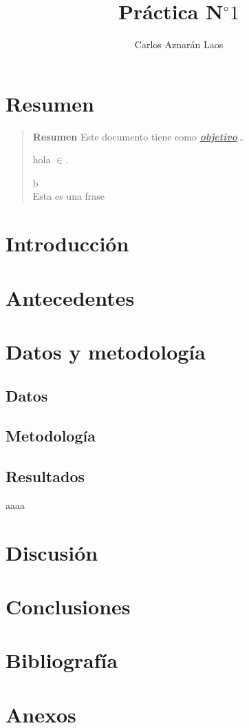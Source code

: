 \documentclass[12pt,a4paper,openany]{book}
\author{Carlos Aznarán Laos}
\title{Práctica N$^{\circ}1$}
\begin{document}
\maketitle

\chapter*{Resumen}
\begin{quotation}
	\textbf{Resumen}
	Este documento tiene como
	\huge{\textbf{\underline{\textit{objetivo}}}}\ldots
	\begin{center}
		hola $\in$.
	\end{center}
	\begin{flushright}
		b\\
		Esta es una frase
	\end{flushright}
\end{quotation}
\pagebreak

\chapter{Introducción}

\chapter{Antecedentes}

\chapter{Datos y metodología}

\section{Datos}

\section{Metodología}

\begin{landscape}
	\chapter{Resultados}
	\huge{aaaa}
\end{landscape}
\pagebreak

\chapter{Discusión}

\chapter{Conclusiones}

\chapter*{Bibliografía}

\chapter*{Anexos}
\end{document}
